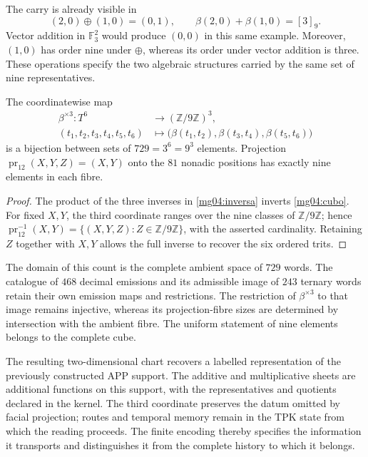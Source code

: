 The carry is already visible in
\[
 (2,0)\oplus(1,0)=(0,1),\qquad
 \beta(2,0)+\beta(1,0)=[3]_9.
\]
Vector addition in \(\mathbb F_3^2\) would produce \((0,0)\)
in this same example. Moreover, \((1,0)\) has order nine under
\(\oplus\), whereas its order under vector addition is three.
These operations specify the two algebraic structures carried by
the same set of nine representatives.

\begin{corollary}
The coordinatewise map
\begin{equation}
 \begin{split}
 \beta^{\times3}:T^6&\longrightarrow(\mathbb Z/9\mathbb Z)^3,\\
 (t_1,t_2,t_3,t_4,t_5,t_6)&\longmapsto
 \bigl(\beta(t_1,t_2),\beta(t_3,t_4),\beta(t_5,t_6)\bigr)
 \end{split}
 \label{mg04:cubo}
\end{equation}
is a bijection between sets of \(729=3^6=9^3\) elements. Projection
\(\operatorname{pr}_{12}(X,Y,Z)=(X,Y)\) onto the \(81\)
nonadic positions has exactly nine elements in each fibre.
\end{corollary}

\begin{proof}
The product of the three inverses in \eqref{mg04:inversa} inverts
\eqref{mg04:cubo}. For fixed \(X,Y\), the third coordinate ranges
over the nine classes of \(\mathbb Z/9\mathbb Z\); hence
\(\operatorname{pr}_{12}^{-1}(X,Y)=
\{(X,Y,Z):Z\in\mathbb Z/9\mathbb Z\}\), with the asserted
cardinality. Retaining \(Z\) together with \(X,Y\) allows the full
inverse to recover the six ordered trits.
\end{proof}

The domain of this count is the complete ambient space of \(729\)
words. The catalogue of \(468\) decimal emissions and its admissible
image of \(243\) ternary words retain their own emission maps and
restrictions. The restriction of \(\beta^{\times3}\) to that image
remains injective, whereas its projection-fibre sizes are determined
by intersection with the ambient fibre. The uniform statement of
nine elements belongs to the complete cube.

The resulting two-dimensional chart recovers a labelled representation
of the previously constructed APP support. The additive and multiplicative sheets are additional functions
on this support, with the representatives and quotients declared in
the kernel. The third coordinate preserves the datum omitted by facial
projection; routes and temporal memory remain in the TPK state from
which the reading proceeds. The finite encoding thereby specifies
the information it transports and distinguishes it from the complete
history to which it belongs.
